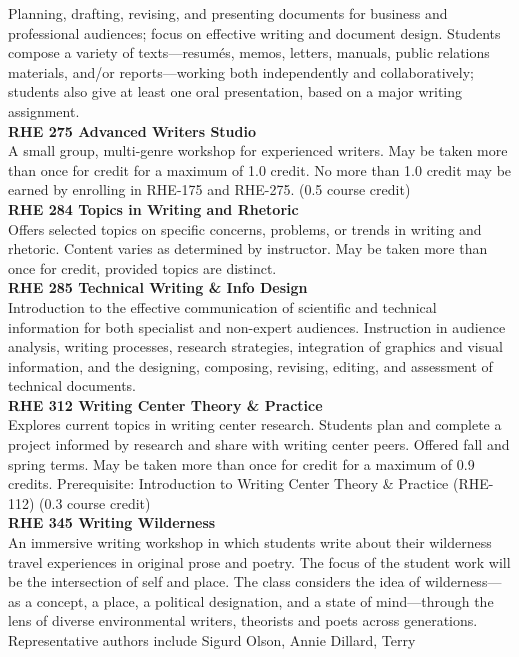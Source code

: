\documentclass[
  letterpaper,
]{scrbook}
\begin{document}
Planning, drafting, revising, and presenting documents for business and
professional audiences; focus on effective writing and document design.
Students compose a variety of texts---resumés, memos, letters, manuals,
public relations materials, and/or reports---working both independently
and collaboratively; students also give at least one oral presentation,
based on a major writing assignment.\\
\textbf{RHE 275 Advanced Writers Studio}\\
A small group, multi-genre workshop for experienced writers. May be
taken more than once for credit for a maximum of 1.0 credit. No more
than 1.0 credit may be earned by enrolling in RHE-175 and RHE-275. (0.5
course credit)\\
\textbf{RHE 284 Topics in Writing and Rhetoric}\\
Offers selected topics on specific concerns, problems, or trends in
writing and rhetoric. Content varies as determined by instructor. May be
taken more than once for credit, provided topics are distinct.\\
\textbf{RHE 285 Technical Writing \& Info Design}\\
Introduction to the effective communication of scientific and technical
information for both specialist and non-expert audiences. Instruction in
audience analysis, writing processes, research strategies, integration
of graphics and visual information, and the designing, composing,
revising, editing, and assessment of technical documents.\\
\textbf{RHE 312 Writing Center Theory \& Practice}\\
Explores current topics in writing center research. Students plan and
complete a project informed by research and share with writing center
peers. Offered fall and spring terms. May be taken more than once for
credit for a maximum of 0.9 credits. Prerequisite: Introduction to
Writing Center Theory \& Practice (RHE-112) (0.3 course credit)\\
\textbf{RHE 345 Writing Wilderness}\\
An immersive writing workshop in which students write about their
wilderness travel experiences in original prose and poetry. The focus of
the student work will be the intersection of self and place. The class
considers the idea of wilderness---as a concept, a place, a political
designation, and a state of mind---through the lens of diverse
environmental writers, theorists and poets across generations.
Representative authors include Sigurd Olson, Annie Dillard, Terry
\end{document}
